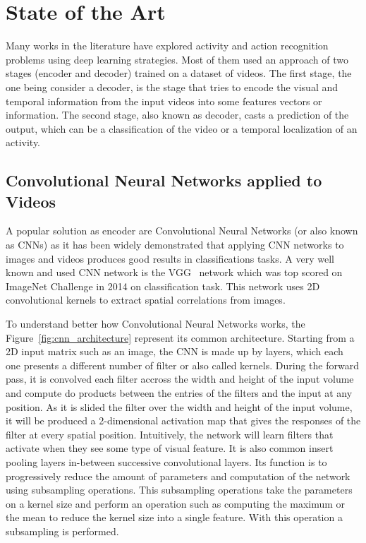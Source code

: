 \chapter{State of the Art}

Many works in the literature have explored activity and action recognition problems using deep learning strategies. Most of them used an approach of two stages (encoder and decoder) trained on a dataset of videos. The first stage, the one being consider a decoder, is the stage that tries to encode the visual and temporal information from the input videos into some features vectors or information. The second stage, also known as decoder, casts a prediction of the output, which can be a classification of the video or a temporal localization of an activity.

\section{Convolutional Neural Networks applied to Videos}

A popular solution as encoder are Convolutional Neural Networks (or also known as CNNs) as it has been widely demonstrated that applying CNN networks to images and videos produces good results in classifications tasks. A very well known and used CNN network is the VGG~\cite{Simonyan14c} network which was top scored on ImageNet Challenge in 2014 on classification task. This network uses 2D convolutional kernels to extract spatial correlations from images.

To understand better how Convolutional Neural Networks works, the Figure~\ref{fig:cnn_architecture} represent its common architecture. Starting from a 2D input matrix such as an image, the CNN is made up by layers, which each one presents a different number of filter or also called kernels.
During the forward pass, it is convolved each filter accross the width and height of the input volume and compute do products between the entries of the filters and the input at any position. As it is slided the filter over the width and height of the input volume, it will be produced a 2-dimensional activation map that gives the responses of the filter at every spatial position.
Intuitively, the network will learn filters that activate when they see some type of visual feature. It is also common insert pooling layers in-between successive convolutional layers.
Its function is to progressively reduce the amount of parameters and computation of the network using subsampling operations. This subsampling operations take the parameters on a kernel size and perform an operation such as computing the maximum or the mean to reduce the kernel size into a single feature. With this operation a subsampling is performed.

